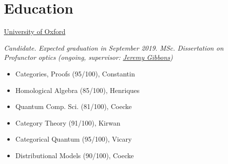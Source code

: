 \documentclass[nocolors]{friggeri-cv-a4}
\begin{document}
\section{Education}

\begin{entrylist}


  {\href{https://www.ox.ac.uk/admissions/graduate/courses/msc-mathematics-and-foundations-computer-science?wssl=1}
    {University of Oxford}}
  {\emph{Candidate. Expected graduation in September 2019. MSc. Dissertation on Profunctor optics (ongoing, supervisor: \href{https://www.cs.ox.ac.uk/people/jeremy.gibbons/}{Jeremy Gibbons})} {\scriptsize
    \begin{multicols}{2}
      \begin{itemize}[topsep=0pt]
      \item Categories, Proofs (95/100), Constantin
      \item Homological Algebra (85/100), Henriques
      \item Quantum Comp. Sci. (81/100), Coecke
      \item Category Theory (91/100), Kirwan
      \item Categorical Quantum (95/100), Vicary
      \item Distributional Models (90/100), Coecke
      \end{itemize}
    \end{multicols}
  }}
  

\end{entrylist}
\end{document}
